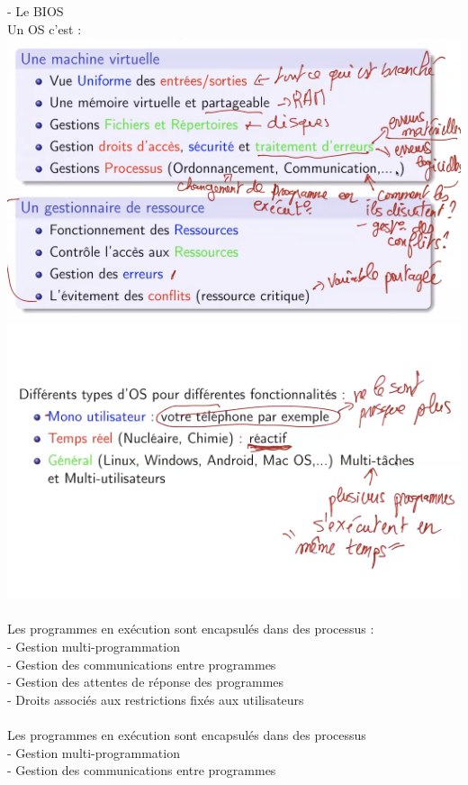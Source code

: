 \documentclass{article}
\begin{document}
    - Le BIOS \\
    \newpage
    Un OS c'est : \\ 
    \includegraphics{4.PNG}
    \includegraphics{5.PNG} \\
    \\
    \newpage
    Les programmes en exécution sont encapsulés dans des processus : \\
    - Gestion multi-programmation \\
    - Gestion des communications entre programmes \\ 
    - Gestion des attentes de réponse des programmes \\
    - Droits associés aux restrictions fixés aux utilisateurs \\
    \\
    Les programmes en exécution sont encapsulés dans des processus \\
    - Gestion multi-programmation \\
    - Gestion des communications entre programmes \\
\end{document}
